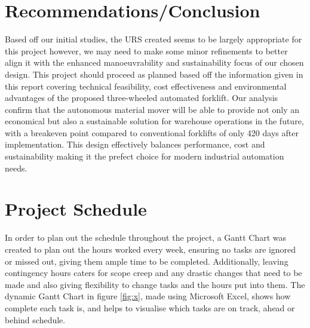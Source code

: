 \documentclass[12pt]{article}
\begin{document}
\section{Recommendations/Conclusion}
Based off our initial studies, the URS created seems to be largely appropriate for this project however, we may need to make some minor refinements to better align it with the enhanced manoeuvrability and sustainability focus of our chosen design. This project should proceed as planned based off the information given in this report covering technical feasibility, cost effectiveness and environmental advantages of the proposed three-wheeled automated forklift. Our analysis confirm that the autonomous material mover will be able to provide not only an economical but also a sustainable solution for warehouse operations in the future, with a breakeven point compared to conventional forklifts of only 420 days after implementation. This design effectively balances performance, cost and sustainability making it the prefect choice for modern industrial automation needs.

\FloatBarrier

\section{Project Schedule}

In order to plan out the schedule throughout the project, a Gantt Chart was created to plan out the hours worked every week, ensuring no tasks are ignored or missed out, giving them ample time to be completed. Additionally, leaving contingency hours caters for scope creep and any drastic changes that need to be made and also giving flexibility to change tasks and the hours put into them. The dynamic Gantt Chart in  figure \ref{fig:x}, made using Microsoft Excel, shows how complete each task is, and helps to visualise which tasks are on track, ahead or behind schedule. 
\end{document}
